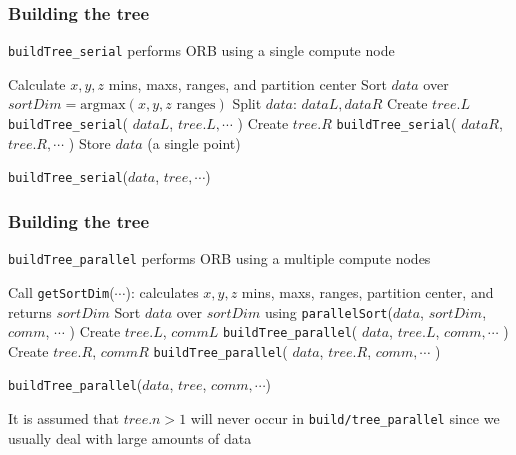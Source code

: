 \documentclass{beamer}
\begin{document}
\begin{frame}
	\frametitle{Building the tree}
	
	\texttt{buildTree\_serial} performs ORB using a single compute node
	
	\vspace{10pt}
	
	\begin{algorithm}[H]
		\footnotesize
		\begin{algorithmic}[1]
				\STATE Calculate $x,y,z$ mins, maxs, ranges, and partition center
				\STATE Sort $data$ over $sortDim = \textrm{argmax}( x,y,z \textrm{ ranges})$
				\STATE Split $data$: $dataL, dataR$
					\STATE Create $tree.L$
					\STATE \texttt{buildTree\_serial}( $dataL$, $tree.L, \cdots$ )
				\ENDIF
					\STATE Create $tree.R$
					\STATE \texttt{buildTree\_serial}( $dataR$, $tree.R, \cdots$ )
				\ENDIF
			\ELSE
				\STATE Store $data$ (a single point)
			\ENDIF
		\end{algorithmic}
	\caption{\texttt{buildTree\_serial}($data$, $tree, \cdots$)}
	\end{algorithm}
		
\end{frame}

\begin{frame}
	\frametitle{Building the tree}
	
	\texttt{buildTree\_parallel} performs ORB using a multiple compute nodes
	
	\vspace{10pt}
	
	\begin{algorithm}[H]
		\footnotesize
		\begin{algorithmic}[1]
			\STATE Call \texttt{getSortDim}($\cdots$): calculates $x,y,z$ mins, maxs, ranges, partition center, and returns $sortDim$
			\STATE Sort $data$ over $sortDim$ using \texttt{parallelSort}($data$, $sortDim$, $comm$, $\cdots$ )
				\STATE Create $tree.L$, $commL$
				\STATE \texttt{buildTree\_parallel}( $data$, $tree.L$, $comm, \cdots$ )
			\ELSE
				\STATE Create $tree.R$, $commR$
				\STATE \texttt{buildTree\_parallel}( $data$, $tree.R$, $comm, \cdots$ )
			\ENDIF
		\end{algorithmic}
		\caption{\texttt{buildTree\_parallel}($data$, $tree$, $comm, \cdots$)}
	\end{algorithm}
	
	\vspace{10pt}
	
	It is assumed that $tree.n > 1$ will never occur in \texttt{build/tree\_parallel} since we usually deal with large amounts of data
		
\end{frame}
\end{document}
